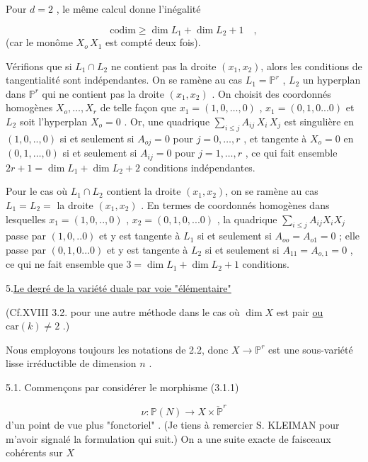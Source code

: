 Pour $d = 2$ , le même calcul donne l'inégalité

\begin{equation*}
\mathrm{codim} \geq \dim L_1 + \dim L_2 + 1 \quad ,
\end{equation*}
(car le monôme $X_o \, X_1$ est compté deux fois).

Vérifions que si $L_1 \cap L_2$ ne contient pas la droite $(x_1,x_2)$, alors les conditions de tangentialité sont indépendantes. On se ramène au cas $L_1 = \mathbb{P}^r$ , $L_2$ un hyperplan dans $\mathbb{P}^r$ qui ne contient pas la droite $(x_1,x_2)$ . On choisit des coordonnés homogènes $X_o,\ldots,X_r$ de telle façon que $x_1 = (1,0,\ldots,0)$ , $x_1 = (0,1,0...0)$ et $L_2$ soit l'hyperplan $X_o = 0$ . Or, une quadrique $\sum\limits_{i \leq j} A_{ij} \, X_i \, X_j$ est singulière en $(1,0,..,0)$ si et seulement si $A_{oj} = 0$ pour $j = 0,\ldots,r$ , et tangente à
$X_o = 0$ en $(0,1,\ldots,0)$ si et seulement si $A_{ij} = 0$ pour $j = 1,\ldots,r$ , ce qui fait ensemble $2r+1 = \dim L_1 + \dim L_2 + 2$ conditions indépendantes.

Pour le cas où $L_1 \cap L_2$ contient la droite $(x_1,x_2)$, on se ramène au cas $L_1 = L_2 =$ la droite $(x_1,x_2)$ . En termes de coordonnés homogènes dans lesquelles $x_1 = (1,0,..,0)$ , $x_2 = (0,1,0,...0)$ , la quadrique $\sum_{i \leq j} A_{ij} X_i X_j$ passe par $(1,0,..0)$ et y est tangente à $L_1$ si et seulement si $A_{oo} = A_{o1} = 0$ ; elle passe par $(0,1,0...0)$ et y est tangente à $L_2$ si et seulement si $A_{11} = A_{o,1} = 0$ , ce qui ne fait ensemble que $3 = \dim L_1 + \dim L_2 + 1$ conditions.


5.\quad \underline{Le degré de la variété duale par voie "élémentaire"}

(Cf.XVIII 3.2. pour une autre méthode dans le cas où $\dim X$ est pair \underline{ou} $\mathrm{car}(k) \neq 2$ .)

Nous employons toujours les notations de 2.2, donc $X \longrightarrow \mathbb{P}^r$ est une sous-variété lisse irréductible de dimension $n$ .

5.1. Commençons par considérer le morphisme (3.1.1)

\begin{equation}\tag{5.1.0}
\nu : \mathbb{P}(N) \longrightarrow X \times \check{\mathbb{P}}^r
\end{equation}
d'un point de vue plus "fonctoriel" . (Je tiens à remercier S. KLEIMAN pour m'avoir signalé la formulation qui suit.) On a une suite exacte
de faisceaux cohérents sur $X$

